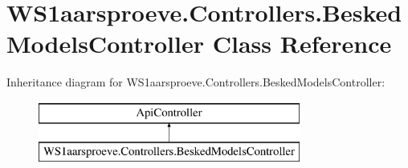 \hypertarget{class_w_s1aarsproeve_1_1_controllers_1_1_besked_models_controller}{}\section{W\+S1aarsproeve.\+Controllers.\+Besked\+Models\+Controller Class Reference}
\label{class_w_s1aarsproeve_1_1_controllers_1_1_besked_models_controller}
Inheritance diagram for W\+S1aarsproeve.\+Controllers.\+Besked\+Models\+Controller\+:\begin{figure}[H]
\begin{center}
\leavevmode
\includegraphics[height=2.000000cm]{class_w_s1aarsproeve_1_1_controllers_1_1_besked_models_controller}
\end{center}
\end{figure}
